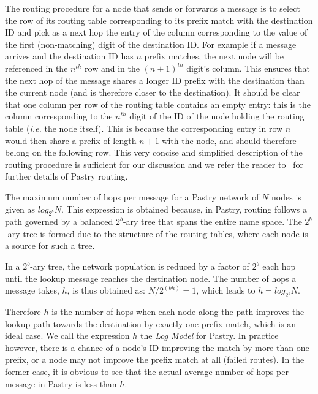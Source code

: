 \documentclass[10pt,twocolumn]{article}
\newcommand{\superscript}[1]{\ensuremath{^\textrm{#1}}}
\begin{document}
The routing procedure for a node that sends or forwards a message is to select
the row of its routing table corresponding to its prefix match with the
destination ID and pick as a next hop the entry of the column corresponding to
the value of the first (non-matching) digit of the destination ID. For example
if a message arrives and the destination ID has $n$ prefix matches, the next
node will be referenced in the $n^{th}$ row and in the $(n+1)^{th}$ digit's
column. This ensures that the next hop of the message shares a longer ID prefix
with the destination than the current node (and is therefore closer to the
destination).
It should be clear that one column per row of the routing table
contains an empty entry: this is the column corresponding to the $n^{th}$ digit
of the ID of the node holding the routing table (\emph{i.e.} the node itself).
This is because the corresponding entry in row $n$ would then share a prefix of
length $n+1$ with the node, and should therefore belong on the following row.
This very concise and simplified description of the routing procedure is
sufficient for our discussion and we refer the reader
to~\cite{Rowstron01Pastry} for further details of Pastry routing.

%

The maximum number of hops per message for a Pastry network of $N$
nodes is given as $log_{2^b} N$. This expression is obtained
because, in Pastry, routing follows a path governed by a balanced
$2^b$-ary tree that spans the entire name space. The $2^b$-ary tree
is formed due to the structure of the routing tables, where each
node is a source for such a tree.

In a $2^b$-ary tree, the network population is reduced by a factor
of $2^b$ each hop until the lookup message reaches the destination
node. The number of hops a message takes, $h$, is thus obtained as:
 $N/2^{(bh)}= 1$, which leads to  $h = log_{2^b} N$.

Therefore $h$ is the number of hops when each node along the path improves the
lookup path towards the destination by exactly one prefix match, which is an
ideal case. We call the expression $h$ the {\em Log Model} for
Pastry. In practice however, there is a chance of a node's ID improving the
match by more than one prefix, or a node may not improve the prefix match at
all (failed routes). In the former case, it is obvious to see that the actual
average number of hops per message in Pastry is less than $h$.
\end{document}
